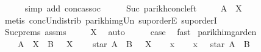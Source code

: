 \begin{isabellebody}
\ \ \ \ \isamarkupfalse%
\ {\isacharparenleft}{\kern0pt}simp\ add{\isacharcolon}{\kern0pt}\ conc{\isacharunderscore}{\kern0pt}assoc{\isacharparenright}{\kern0pt}\isanewline
\ \ \isamarkupfalse%
\ \isamarkupfalse%
\ Suc\ parikh{\isacharunderscore}{\kern0pt}conc{\isacharunderscore}{\kern0pt}left\ \isamarkupfalse%
\ {\isachardoublequoteopen}{\isasymdots}\ {\isasymsubseteq}\ {\isasymPsi}\ {\isacharparenleft}{\kern0pt}A\ {\isacharat}{\kern0pt}{\isacharat}{\kern0pt}\ X{\isacharparenright}{\kern0pt}{\isachardoublequoteclose}\isanewline
\ \ \ \ \isamarkupfalse%
\ {\isacharparenleft}{\kern0pt}metis\ conc{\isacharunderscore}{\kern0pt}Un{\isacharunderscore}{\kern0pt}distrib{\isacharparenleft}{\kern0pt}{}{\isacharparenright}{\kern0pt}\ parikh{\isacharunderscore}{\kern0pt}img{\isacharunderscore}{\kern0pt}Un\ sup{\isachardot}{\kern0pt}orderE\ sup{\isachardot}{\kern0pt}orderI{\isacharparenright}{\kern0pt}\isanewline
\ \ \isamarkupfalse%
\ \isamarkupfalse%
\ Suc{\isachardot}{\kern0pt}prems\ assms\ \isamarkupfalse%
\ {\isachardoublequoteopen}{\isasymdots}\ {\isasymsubseteq}\ {\isasymPsi}\ X{\isachardoublequoteclose}\ \isamarkupfalse%
\ auto\isanewline
\ \ \isamarkupfalse%
\ \isamarkupfalse%
\ {\isacharquery}{\kern0pt}case\ \isamarkupfalse%
\ fast\isanewline
{}\isamarkupfalse%
%
\endisatagproof
{\isafoldproof}%
%
\isadelimproof
\isanewline
%
\endisadelimproof
\isanewline
{}\isamarkupfalse%
\ parikh{\isacharunderscore}{\kern0pt}img{\isacharunderscore}{\kern0pt}arden{\isacharcolon}{\kern0pt}\isanewline
\ \ \ {\isachardoublequoteopen}{\isasymPsi}\ {\isacharparenleft}{\kern0pt}A\ {\isacharat}{\kern0pt}{\isacharat}{\kern0pt}\ X\ {\isasymunion}\ B{\isacharparenright}{\kern0pt}\ {\isasymsubseteq}\ {\isasymPsi}\ X{\isachardoublequoteclose}\isanewline
\ \ \ {\isachardoublequoteopen}{\isasymPsi}\ {\isacharparenleft}{\kern0pt}star\ A\ {\isacharat}{\kern0pt}{\isacharat}{\kern0pt}\ B{\isacharparenright}{\kern0pt}\ {\isasymsubseteq}\ {\isasymPsi}\ X{\isachardoublequoteclose}\isanewline
%
\isadelimproof
%
\endisadelimproof
%
\isatagproof
{}\isamarkupfalse%
\isanewline
\ \ \isamarkupfalse%
\ x\isanewline
\ \ \isamarkupfalse%
\ {\isachardoublequoteopen}x\ {\isasymin}\ {\isasymPsi}\ {\isacharparenleft}{\kern0pt}star\ A\ {\isacharat}{\kern0pt}{\isacharat}{\kern0pt}\ B{\isacharparenright}{\kern0pt}{\isachardoublequoteclose}\isanewline

\end{isabellebody}

